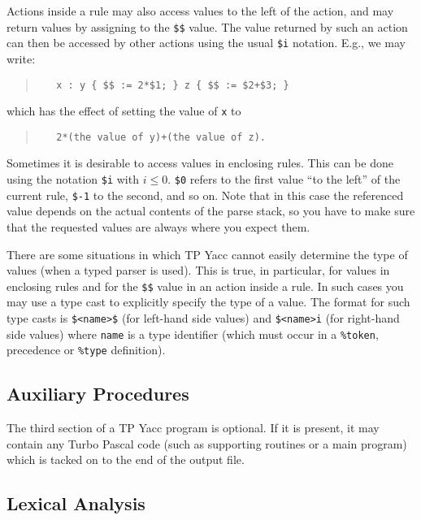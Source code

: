 Actions inside a rule may also access values to the left of the action,
and may return values by assigning to the \verb"$$" value. The value returned
by such an action can then be accessed by other actions using the usual
\verb"$i" notation. E.g., we may write:
\begin{quote}\begin{verbatim}
   x : y { $$ := 2*$1; } z { $$ := $2+$3; }
\end{verbatim}\end{quote}
which has the effect of setting the value of \verb"x" to
\begin{quote}\begin{verbatim}
   2*(the value of y)+(the value of z).
\end{verbatim}\end{quote}

Sometimes it is desirable to access values in enclosing rules. This can be
done using the notation \verb"$i" with $i\leq 0$. \verb"$0" refers to the
first value ``to the left'' of the current rule, \verb"$-1" to the second,
and so on. Note that in this case the referenced value depends on the actual
contents of the parse stack, so you have to make sure that the requested
values are always where you expect them.

There are some situations in which TP Yacc cannot easily determine the
type of values (when a typed parser is used). This is true, in particular,
for values in enclosing rules and for the \verb"$$" value in an action inside
a rule. In such cases you may use a type cast to explicitly specify the type
of a value. The format for such type casts is \verb"$<name>$" (for left-hand
side values) and \verb"$<name>i" (for right-hand side values) where
\verb"name" is a type identifier (which must occur in a \verb"%token",
precedence or \verb"%type" definition).

\subsection{Auxiliary Procedures}

The third section of a TP Yacc program is optional. If it is present, it
may contain any Turbo Pascal code (such as supporting routines or a main
program) which is tacked on to the end of the output file.

\subsection{Lexical Analysis}

